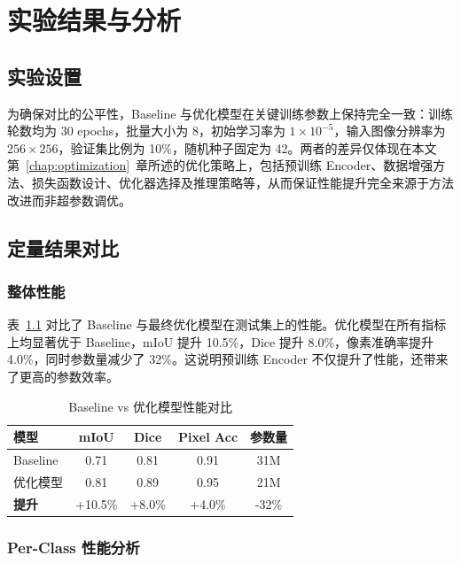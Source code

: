 \chapter{实验结果与分析}
\label{chap:results}

\section{实验设置}

为确保对比的公平性，Baseline 与优化模型在关键训练参数上保持完全一致：训练轮数均为 30 epochs，批量大小为 8，初始学习率为 $1 \times 10^{-5}$，输入图像分辨率为 $256 \times 256$，验证集比例为 10\%，随机种子固定为 42。两者的差异仅体现在本文第~\ref{chap:optimization}~章所述的优化策略上，包括预训练 Encoder、数据增强方法、损失函数设计、优化器选择及推理策略等，从而保证性能提升完全来源于方法改进而非超参数调优。

\section{定量结果对比}

\subsection{整体性能}

表~\ref{tab:final_comparison} 对比了 Baseline 与最终优化模型在测试集上的性能。优化模型在所有指标上均显著优于 Baseline，mIoU 提升 10.5\%，Dice 提升 8.0\%，像素准确率提升 4.0\%，同时参数量减少了 32\%。这说明预训练 Encoder 不仅提升了性能，还带来了更高的参数效率。

\begin{table}[H]
    \centering
    \caption{Baseline vs 优化模型性能对比}
    \label{tab:final_comparison}
    \begin{tabularx}{\textwidth}{Xcccc}
        \hline
        \textbf{模型} & \textbf{mIoU} & \textbf{Dice} & \textbf{Pixel Acc} & \textbf{参数量} \\
        \hline
        Baseline & 0.71 & 0.81 & 0.91 & 31M \\
        优化模型 & 0.81 & 0.89 & 0.95 & 21M \\
        \hline
        \textbf{提升} & +10.5\% & +8.0\% & +4.0\% & -32\% \\
        \hline
    \end{tabularx}
\end{table}

\subsection{Per-Class 性能分析}

